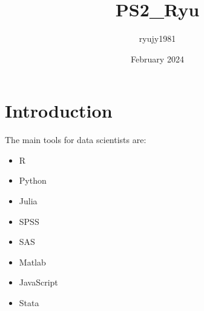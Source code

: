 \documentclass{article}
\title{PS2\_Ryu}
\author{ryujy1981 }
\date{February 2024}
\begin{document}
\maketitle

\section{Introduction}





The main tools for data scientists are: 
\begin{itemize}
    \item R
    \item Python
    \item Julia
    \item SPSS
        \item SAS
            \item Matlab
                \item JavaScript
                    \item Stata
            
\end{itemize}
\end{document}

